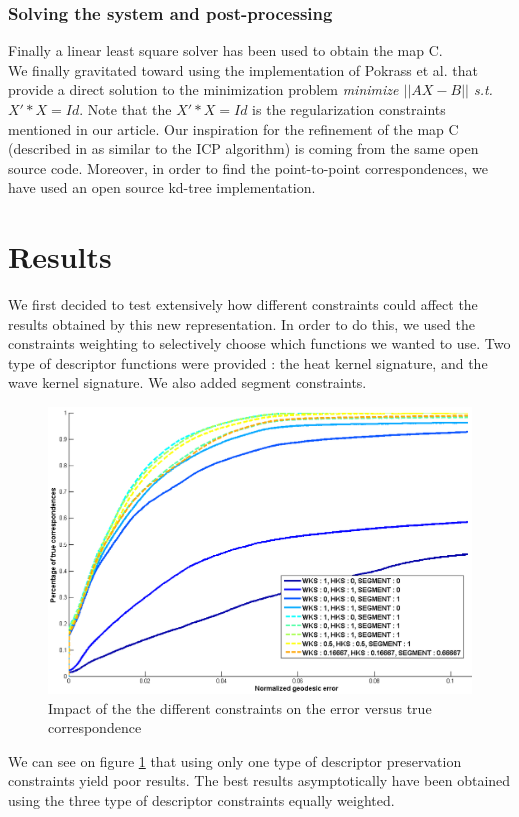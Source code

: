 \documentclass[10pt,twocolumn,letterpaper]{article}
\begin{document}
\subsubsection*{Solving the system and post-processing}
Finally a linear least square solver has been used to obtain the map C. \\

We finally gravitated toward using the implementation of Pokrass et al. that provide a direct solution to the minimization problem \textit{minimize $||AX - B||$ s.t. $X'*X = Id$}. Note that the $X'*X = Id$ is the regularization constraints mentioned in our article. Our inspiration for the refinement of the map C (described in \cite{ovs} as similar to the ICP algorithm) is coming from the same open source code. Moreover, in order to find the point-to-point correspondences, we have used an open source kd-tree implementation.



\section{Results} %
We first decided to test extensively how different constraints could affect the results obtained by this new representation. In order to do this, we used the constraints weighting to selectively choose which functions we wanted to use. Two type of descriptor functions were provided : the heat kernel signature, and the wave kernel signature. We also added segment constraints.

\begin{figure}[h]
\centering
\includegraphics[width=.4\textwidth]{Images/weights.png}
\caption{Impact of the the different constraints on the error versus true correspondence}
\label{fig_weights}
\end{figure}

We can see on figure \ref{fig_weights} that using only one type of descriptor preservation constraints yield poor results. The best results asymptotically have been obtained using the three type of descriptor constraints equally weighted.
\end{document}

